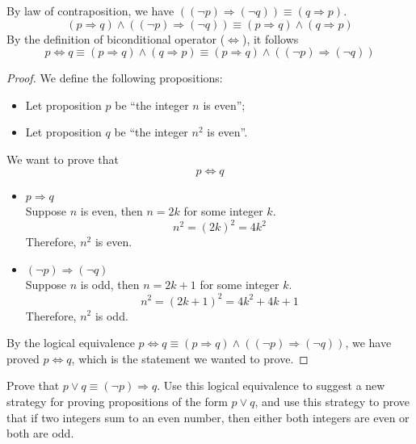 \begin{solutions*}
    By law of contraposition, we have $((\neg p) \Rightarrow (\neg q)) \equiv (q \Rightarrow p)$. 
    \[(p \Rightarrow q) \wedge ((\neg p) \Rightarrow (\neg q)) \equiv (p \Rightarrow q) \wedge (q \Rightarrow p)\]
    By the definition of biconditional operator ($\Leftrightarrow$), it follows
    \[p \Leftrightarrow q \equiv (p \Rightarrow q) \wedge(q \Rightarrow p) \equiv (p \Rightarrow q) \wedge ((\neg p) \Rightarrow (\neg q))\]

    \begin{proof}
        We define the following propositions: 
        \begin{itemize}
            \item Let proposition $p$ be ``the integer $n$ is even'';
            \item Let proposition $q$ be ``the integer $n^2$ is even''.
        \end{itemize}
        We want to prove that
        \[p \Leftrightarrow q\]
        \begin{itemize}
            \item $p \Rightarrow q$\\
            Suppose $n$ is even, then $n = 2k$ for some integer $k$.
            \[n^2 = (2k)^2 = 4k^2\]
            Therefore, $n^2$ is even.
            \item $(\neg p) \Rightarrow (\neg q)$\\
            Suppose $n$ is odd, then $n = 2k+1$ for some integer $k$.
            \[n^2 = (2k+1)^2 = 4k^2+4k+1\]
            Therefore, $n^2$ is odd.
        \end{itemize}
        By the logical equivalence $p \Leftrightarrow q \equiv (p \Rightarrow q) \wedge ((\neg p) \Rightarrow (\neg q))$, we have proved $p \Leftrightarrow q$, which is the statement we wanted to prove.
    \end{proof}
\end{solutions*}

\begin{exercise}
Prove that $p \vee q \equiv (\neg p) \Rightarrow q$. Use this logical equivalence to suggest a new strategy for proving propositions of the form $p \vee q$, and use this strategy to prove that if two integers sum to an even number, then either both integers are even or both are odd.
\end{exercise}

